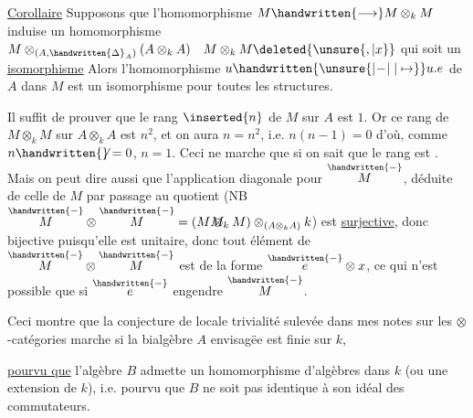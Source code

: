 
\uline{Corollaire} Supposons que l'homomorphisme $M\handwritten{\longrightarrow}M\otimes_{k}M$ induise un homomorphisme $M\otimes_{(A,\handwritten{\Delta}_{A})}(A\otimes_{k}A)\quad M\otimes_{k}M\deleted{\unsure{,|x}}$  qui soit un \uline{isomorphisme} Alors l'homomorphisme $u\handwritten{\unsure{\mathrel{\vert\! -\!\vert}|\mapsto}}u.e$ de $A$ dans $M$ est un isomorphisme pour toutes les structures.

Il suffit de prouver que le rang $\inserted{n}$ de $M$ sur $A$ est $1$. Or ce rang de $M\otimes_{k}M$ sur $A\otimes_{k}A$ est $n^{2}$, et on aura $n=n^{2}$, i.e. $n(n-1)=0$ d'où, comme $n\handwritten{\not}=0$, $n=1$. Ceci ne marche que si on sait que le rang est . Mais on peut dire aussi que l'application diagonale pour $\overset{\handwritten{-}}{M}$, déduite de celle de $M$ par passage au quotient (NB $\overset{\handwritten{-}}{M}\otimes\overset{\handwritten{-}}{M}=(M\rlap{\(M\)}\otimes_{k}M)\otimes_{(A\otimes_{k}A)}k$) est \uline{surjective}, donc bijective puisqu'elle est unitaire, donc tout élément de $\overset{\handwritten{-}}{M}\otimes\overset{\handwritten{-}}{M}$ est de la forme $\overset{\handwritten{-}}{e}\otimes x$, ce qui n'est possible que si $\overset{\handwritten{-}}{e}$ engendre $\overset{\handwritten{-}}{M}$.

Ceci montre que la conjecture de locale trivialité sulevée dans mes notes sur les $\otimes$-catégories marche si la bialgèbre $A$ envisagëe est finie sur $k$, \uline{pourvu que} l'algèbre $B$ admette un homomorphisme d'algèbres dans $k$ (ou une extension de $k$), i.e. pourvu que $B$ ne soit pas identique à son idéal des commutateurs.
